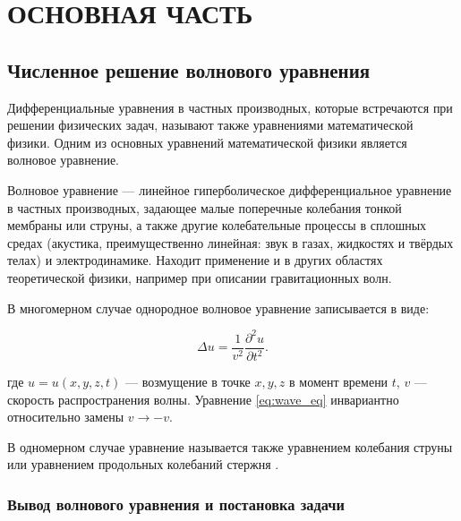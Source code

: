 \documentclass[12pt,a4paper,russian]{report}
\renewcommand*{\contentsname}{СОДЕРЖАНИЕ}
\begin{document}
	
	\renewcommand{\contentsname}{СОДЕРЖАНИЕ} 
	\tableofcontents
	
	
	
	\newpage
	\chapter*{ОСНОВНАЯ ЧАСТЬ}
	
	
	
	\section{Численное решение волнового уравнения}
	
	Дифференциальные уравнения в частных производных, которые встречаются при решении физических задач, называют также уравнениями математической физики. Одним из основных уравнений математической физики является волновое уравнение.
	
	Волновое уравнение --- линейное гиперболическое дифференциальное уравнение в частных производных, задающее малые поперечные колебания тонкой мембраны или струны, а также другие колебательные процессы в сплошных средах (акустика, преимущественно линейная: звук в газах, жидкостях и твёрдых телах) и электродинамике. Находит применение и в других областях теоретической физики, например при описании гравитационных волн.
	
	В многомерном случае однородное волновое уравнение записывается в виде:
	
	\begin{equation} \label{eq:wave_eq}
		\Delta u = \frac{1}{v^2} \frac{\partial^2 u}{\partial t^2}.
	\end{equation}
	
	где $u = u(x, y, z, t)$ --- возмущение в точке $x, y, z$ в момент времени $t$, $v$ --- скорость распространения волны. Уравнение \eqref{eq:wave_eq} инвариантно относительно замены $v \rightarrow -v$.
	
	В одномерном случае уравнение называется также уравнением колебания струны или уравнением продольных колебаний стержня \cite{Semenchok_String}.
	
	
	\subsection{Вывод волнового уравнения и постановка задачи}
	
\end{document}
